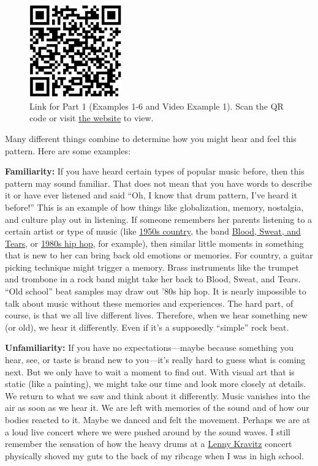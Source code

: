 \documentclass[twoside]{article}
\providecommand{\wmturlcaption}{
  Scan the QR code or visit \href{https://worldmusictextbook.org/witulski-2021}{the website} to view.
}
\begin{document}
\begin{figure}
  \centering
  \includegraphics[height=4cm]{witulski-rhythm-part-1.png}
  \caption*{Link for Part 1 (Examples 1-6 and Video Example 1). \wmturlcaption}
\end{figure}

Many different things combine to determine how you might hear and feel
this pattern. Here are some examples:

\textbf{Familiarity:} If you have heard certain types of popular music
before, then this pattern may sound familiar. That does not mean that
you have words to describe it or have ever listened and said ``Oh, I
know that drum pattern, I've heard it before!'' This is an example of
how things like globalization, memory, nostalgia, and culture play out
in listening. If someone remembers her parents listening to a certain
artist or type of music (like
\href{https://www.youtube.com/watch?v=bjCoKslQOEs}{1950s country}, the
band \href{https://www.youtube.com/watch?v=P5jNJd7HRVU}{Blood, Sweat,
and Tears}, or \href{https://www.youtube.com/watch?v=nyYqkRv0D5g}{1980s
hip hop}, for example), then similar little moments in something that is
new to her can bring back old emotions or memories. For country, a
guitar picking technique might trigger a memory. Brass instruments like
the trumpet and trombone in a rock band might take her back to Blood,
Sweat, and Tears. ``Old school'' beat samples may draw out '80s hip hop.
It is nearly impossible to talk about music without these memories and
experiences. The hard part, of course, is that we all live different
lives. Therefore, when we hear something new (or old), we hear it
differently. Even if it's a supposedly ``simple'' rock beat.

\textbf{Unfamiliarity:} If you have no expectations---maybe because
something you hear, see, or taste is brand new to you---it's really hard
to guess what is coming next. But we only have to wait a moment to find
out. With visual art that is static (like a painting), we might take our
time and look more closely at details. We return to what we saw and
think about it differently. Music vanishes into the air as soon as we
hear it. We are left with memories of the sound and of how our bodies
reacted to it. Maybe we danced and felt the movement. Perhaps we are at
a loud live concert where we were pushed around by the sound waves. I
still remember the sensation of how the heavy drums at a
\href{https://www.youtube.com/watch?v=8LhCd1W2V0Q}{Lenny Kravitz}
concert physically shoved my guts to the back of my ribcage when I was
in high school.
\end{document}
